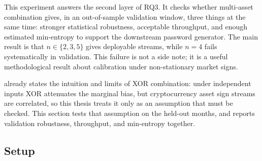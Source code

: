 \documentclass[11pt,titlepage,openany,oneside]{book}  %
\begin{document}
This experiment answers the second layer of RQ3. It checks whether multi-asset combination gives, in an out-of-sample validation window, three things at the same time: stronger statistical robustness, acceptable throughput, and enough estimated min-entropy to support the downstream password generator. The main result is that $n \in \{2,3,5\}$ gives deployable streams, while $n=4$ fails systematically in validation. This failure is not a side note; it is a useful methodological result about calibration under non-stationary market signs.

 already states the intuition and limits of XOR combination: under independent inputs XOR attenuates the marginal bias, but cryptocurrency asset sign streams are correlated, so this thesis treats it only as an assumption that must be checked. This section tests that assumption on the held-out months, and reports validation robustness, throughput, and min-entropy together.

\subsection{Setup}
\label{sec:exp4-setup}
\end{document}
